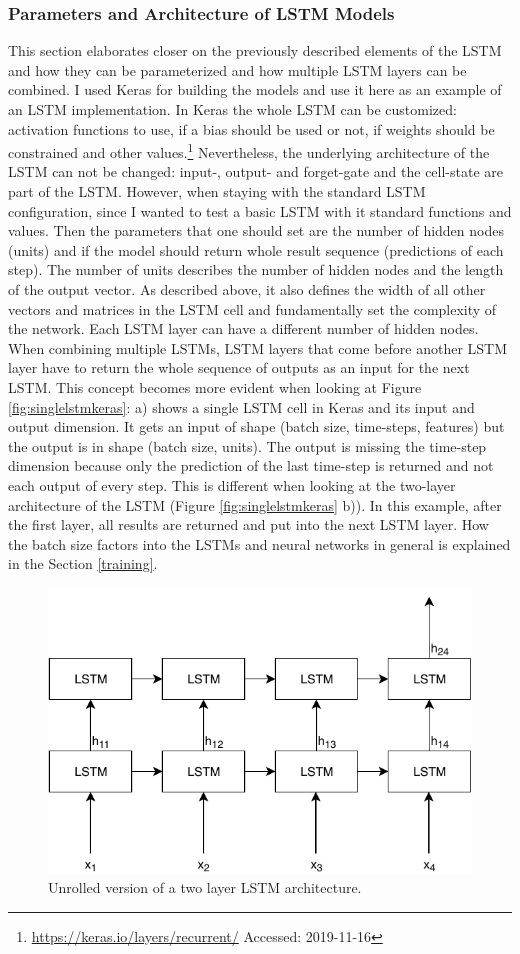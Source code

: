 \subsubsection{Parameters and Architecture of LSTM Models}
This section elaborates closer on the previously described elements of the LSTM and how they can be parameterized and how multiple LSTM layers can be combined.
I used Keras for building the models and use it here as an example of an LSTM implementation.
In Keras the whole LSTM can be customized: activation functions to use, if a bias should be used or not, if weights should be constrained and other values.\footnote{\url{https://keras.io/layers/recurrent/} Accessed: 2019-11-16}
Nevertheless, the underlying architecture of the LSTM can not be changed: input-, output- and forget-gate and the cell-state are part of the LSTM.
However, when staying with the standard LSTM configuration, since I wanted to test a basic LSTM with it standard functions and values.
Then the parameters that one should set are the number of hidden nodes (units) and if the model should return whole result sequence (predictions of each step).
The number of units describes the number of hidden nodes and the length of the output vector.
As described above, it also defines the width of all other vectors and matrices in the LSTM cell and fundamentally set the complexity of the network.
Each LSTM layer can have a different number of hidden nodes.
When combining multiple LSTMs, LSTM layers that come before another LSTM layer have to return the whole sequence of outputs as an input for the next LSTM.
This concept becomes more evident when looking at Figure \ref{fig:singlelstmkeras}: a) shows a single LSTM cell in Keras and its input and output dimension.
It gets an input of shape (batch size, time-steps, features) but the output is in shape (batch size, units).
The output is missing the time-step dimension because only the prediction of the last time-step is returned and not each output of every step.
This is different when looking at the two-layer architecture of the LSTM (Figure \ref{fig:singlelstmkeras} b)).
In this example, after the first layer, all results are returned and put into the next LSTM layer.  
How the batch size factors into the LSTMs and neural networks in general is explained in the Section \ref{training}.          

\begin{figure}
	\centering
	\includegraphics[width=0.7\linewidth]{Pictures/unrolled2layerLSTM}
	\caption{Unrolled version of a two layer LSTM architecture.}
	\label{fig:unrolled2layerlstm}
\end{figure}

